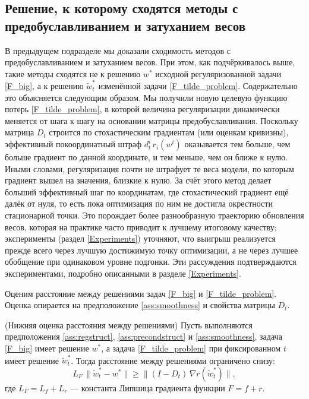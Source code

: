 \subsection{Решение, к которому сходятся методы с предобуславливанием и затуханием весов}

В предыдущем подразделе мы доказали сходимость методов с предобуславливанием и затуханием весов. При этом, как подчёркивалось выше, такие методы сходятся не к решению $w^*$ исходной регуляризованной задачи \eqref{F_big}, а к решению $\widetilde{w}^*_t$ изменённой задачи \eqref{F_tilde_problem}. Содержательно это объясняется следующим образом. Мы получили новую целевую функцию потерь \eqref{F_tilde_problem}, в которой величина регуляризации динамически меняется от шага к шагу на основании матрицы предобуславливания. Поскольку матрица $D_t$ строится по стохастическим градиентам (или оценкам кривизны), эффективный покоординатный штраф $d_t^i \, r_i(w^i)$ оказывается тем больше, чем больше градиент по данной координате, и тем меньше, чем он ближе к нулю. Иными словами, регуляризация почти не штрафует те веса модели, по которым градиент вышел на значения, близкие к нулю. За счёт этого метод делает больший эффективный шаг по координатам, где стохастический градиент ещё далёк от нуля, то есть пока оптимизация по ним не достигла окрестности стационарной точки. Это порождает более разнообразную траекторию обновления весов, которая на практике часто приводит к лучшему итоговому качеству; эксперименты (раздел \ref{Experiments}) уточняют, что выигрыш реализуется прежде всего через лучшую достижимую точку оптимизации, а не через лучшее обобщение при одинаковом уровне подгонки. Эти рассуждения подтверждаются экспериментами, подробно описанными в разделе \ref{Experiments}.

Оценим расстояние между решениями задач \eqref{F_big} и \eqref{F_tilde_problem}. Оценка опирается на предположение \ref{ass:smoothness} и свойства матрицы $D_t$.

\begin{lemma}\label{lemma:lowerbondF}{(Нижняя оценка расстояния между решениями)}
Пусть выполняются предположения \ref{ass:regstruct}, \ref{ass:precondstruct} и \ref{ass:smoothness}, задача \eqref{F_big} имеет решение $w^*$, а задача \eqref{F_tilde_problem} при фиксированном $t$ имеет решение $\widetilde{w}^*_t$. Тогда расстояние между решениями ограничено снизу:
    \begin{equation*}
        L_F \, \|\widetilde{w}^*_t - w^* \| \geq \| (I - D_t)\, \nabla r (\widetilde{w}^*_t)\|,
    \end{equation*}
    где $L_F = L_f + L_r$ --- константа Липшица градиента функции $F = f + r$.
\end{lemma}

